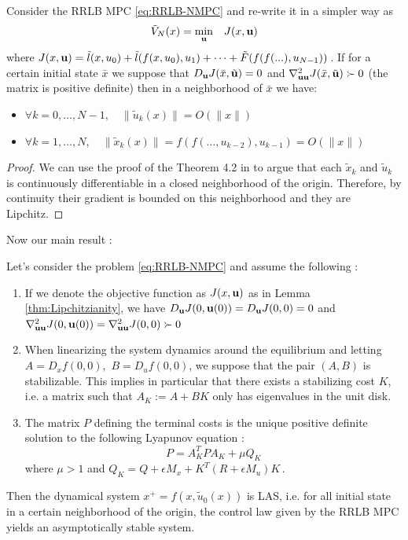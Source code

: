 \documentclass[12pt]{article}
\begin{document}
\begin{lemma}
	\label{thm:Lipchitzianity}
	Consider the RRLB MPC \ref{eq:RRLB-NMPC} and re-write it in a simpler way as
	$$\tilde{V}_N(x)=\underset{\bf{u}}{\min} \quad J(x,\bf{u})$$
	where $J(x,\bf{u})=\tilde{l}(x,u_0)+\tilde{l}(f(x,u_0),u_1)+\dots+\tilde{F}(f(f(...),u_{N-1}))$\,.
	If for a certain initial state $\bar{x}$ we suppose that $D_\bf{u}J(\bar{x},\tilde{\bf{u}})=0$ and $\nabla_{\bf{u}\bf{u}}^2J(\bar{x}, \tilde{\bf{u}})\succ 0$ (the matrix is positive definite) then in a neighborhood of $\bar{x}$ we have:
	\begin{itemize}[label=\textbullet]
		\item $\forall k=0,\dots,N-1,\quad \|\tilde{u}_k(x)\|=O(\|x\|)$
		\item $\forall k=1,\dots,N,\quad \|\tilde{x}_k(x)\|=f(f(\dots,u_{k-2}),u_{k-1})=O(\|x\|)$
	\end{itemize}
\end{lemma}
\begin{proof}
	We can use the proof of the Theorem 4.2 in \cite{lectures-parametric-optimization} to argue that each $\tilde{x}_k$ and $\tilde{u}_k$ is continuously differentiable in a closed neighborhood of the origin.
	Therefore, by continuity their gradient is bounded on this neighborhood and they are Lipchitz.
\end{proof}

\noindent Now our main result :

\begin{theorem}\label{thm:nominal-stability}
	Let's consider the problem \ref{eq:RRLB-NMPC} and assume the following :
	\begin{enumerate}
		\item If we denote the objective function as $J(x,\bf{u})$ as in Lemma \ref{thm:Lipchitzianity}, we have $D_\bf{u}J(0,\bf{u}(0))=D_\bf{u}J(0,0)=0$ and $\nabla^2_{\bf{u}\bf{u}}J(0,\bf{u}(0))=\nabla^2_{\bf{u}\bf{u}}J(0,0)\succ 0$

		\item When linearizing the system dynamics around the equilibrium and letting $A=D_xf(0,0),$ $B=D_uf(0,0)$, we suppose that the pair $(A,B)$ is stabilizable.
		This implies in particular that there exists a stabilizing cost $K$, i.e. a matrix such that $A_K:=A+BK$ only has eigenvalues in the unit disk.

		\item The matrix $P$ defining the terminal costs is the unique positive definite solution to the following Lyapunov equation :
		\begin{equation*}
			P=A_K^TPA_K+\mu Q_K
		\end{equation*}
		where $\mu>1$ and $Q_K=Q+\epsilon M_x+K^T(R+\epsilon M_u)K$\,.
	\end{enumerate}
	Then the dynamical system $x^+=f(x,\tilde{u}_0(x))$ is LAS, i.e. for all initial state in a certain neighborhood of the origin, the control law given by the RRLB MPC yields an asymptotically stable system.
\end{theorem}
\end{document}

